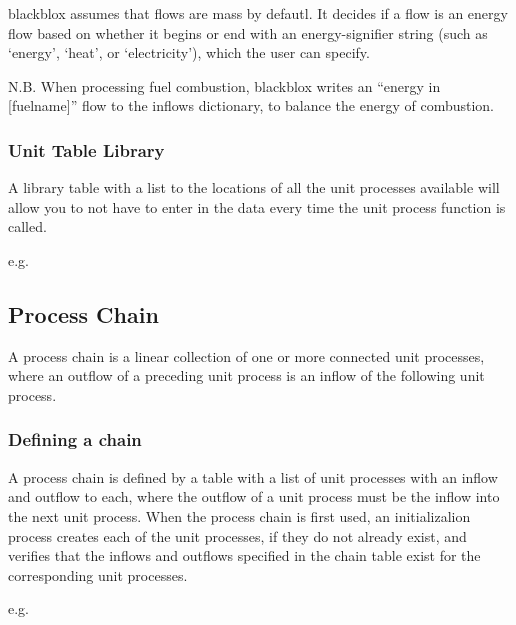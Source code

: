 \documentclass[a4paper,10pt,english]{sphinxmanual}
\begin{document}
blackblox assumes that flows are mass by defautl. It decides if a flow is an energy flow based on whether it begins or end with an energy-signifier string (such as ‘energy’, ‘heat’, or ‘electricity’), which the user can specify.

N.B. When processing fuel combustion, blackblox writes an “energy in {[}fuelname{]}” flow to the inflows dictionary, to balance the energy of combustion.


\subsubsection{Unit Table Library}
\label{\detokenize{intro:unit-table-library}}
A library table with a list to the locations of all the unit processes available will allow you to not have to enter in the data every time the unit process function is called.

e.g.




\subsection{Process Chain}
\label{\detokenize{intro:process-chain}}
A process chain is a linear collection of one or more connected unit processes, where an outflow of a preceding unit process is an inflow of the following unit process.


\subsubsection{Defining a chain}
\label{\detokenize{intro:defining-a-chain}}
A process chain is defined by a table with a list of unit processes with an inflow and outflow to each, where the outflow of a unit process must be the inflow into the next unit process. When the process chain is first used, an initializalion process creates each of the unit processes, if they do not already exist, and verifies that the inflows and outflows specified in the chain table exist for the corresponding unit processes.

e.g.
\end{document}
